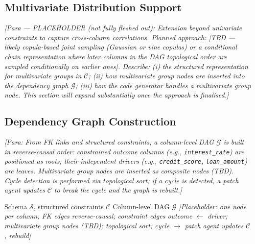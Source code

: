 \subsection{Multivariate Distribution Support}
\label{subsec:multivariate}
\textit{[Para --- PLACEHOLDER (not fully fleshed out):
Extension beyond univariate constraints to capture cross-column correlations.
Planned approach: [TBD --- likely copula-based joint sampling (Gaussian or vine copulas)
or a conditional chain representation where later columns in the DAG topological order
are sampled conditionally on earlier ones].
Describe: (i) the structured representation for multivariate groups in $\mathcal{C}$;
(ii) how multivariate group nodes are inserted into the dependency graph $\mathcal{G}$;
(iii) how the code generator handles a multivariate group node.
This section will expand substantially once the approach is finalised.]}

\subsection{Dependency Graph Construction}
\textit{[Para: From FK links and structured constraints, a column-level DAG $\mathcal{G}$
is built in \emph{reverse-causal} order: constrained outcome columns
(e.g., \texttt{interest\_rate}) are positioned as roots; their independent drivers
(e.g., \texttt{credit\_score}, \texttt{loan\_amount}) are leaves.
Multivariate group nodes are inserted as composite nodes (TBD).
Cycle detection is performed via topological sort; if a cycle is detected, a patch agent
updates $\mathcal{C}$ to break the cycle and the graph is rebuilt.]}

\begin{algorithm}[t]
\caption{Deterministic Dependency DAG Construction}
\label{alg:dag}
\begin{algorithmic}[1]
  \Require Schema $\mathcal{S}$, structured constraints $\mathcal{C}$
  \Ensure Column-level DAG $\mathcal{G}$
  \State \textit{[Placeholder: one node per column; FK edges reverse-causal;
         constraint edges outcome $\leftarrow$ driver; multivariate group nodes (TBD);
         topological sort; cycle $\to$ patch agent updates $\mathcal{C}$, rebuild]}
\end{algorithmic}
\end{algorithm}

